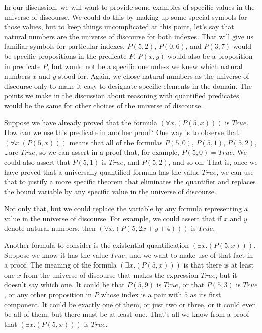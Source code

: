 {{In our discussion, we will want to provide some examples
of specific values in the universe of discourse.
We could do this by making up some special symbols for those values,
but to keep things uncomplicated at this point,
let's say that natural numbers are the universe of discourse for both indexes.
That will give us familiar symbols for particular indexes.
$P(5,2)$, $P(0,6)$, and $P(3,7)$ would be specific propositions in the predicate $P$.
$P(x,y)$ would also be a proposition in predicate $P$, but would not be a specific one
unless we knew which natural numbers $x$ and $y$ stood for.
Again, we chose natural numbers as the universe of discourse
only to make it easy to designate specific elements in the domain.
The points we make in the discussion about reasoning with quantified predicates
would be the same for other choices of the universe of discourse.

Suppose we have already proved that the formula $(\forall x.(P(5, x)))$ is $True$.
How can we use this predicate in another proof?
One way is to observe that $(\forall x.(P(5, x)))$ means that all of the formulas
$P(5, 0)$, $P(5, 1)$, $P(5, 2)$, \dots are $True$,
so we can assert in a proof that, for example,
$P(5, 0) = True$. We could also assert that $P(5, 1)$ is $True$, and $P(5, 2)$, and so on.
That is, once we have proved that a universally quantified formula has the value $True$,
we can use that to justify a more specific theorem that
eliminates the quantifier and replaces the bound variable by any specific value
in the universe of discourse.

Not only that, but we could replace the variable by any formula
representing a value in the universe of discourse.
For example, we could assert that if $x$ and $y$ denote natural numbers,
then $(\forall x.(P(5, 2x + y + 4)))$ is $True$.

Another formula to consider is the existential quantification $(\exists x.(P(5, x)))$.
Suppose we know it has the value $True$, and we want to make use of that fact in a proof.
The meaning of the formula $(\exists x.(P(5, x)))$ is that
there is at least one $x$ from the universe of discourse that makes the expression $True$,
but it doesn't say which one.
It could be that $P(5, 9)$ is $True$, or that $P(5, 3)$ is $True$,
or any other proposition in $P$ whose index is a pair with $5$ as its first component.
It could be exactly one of them,
or just two or three, or it could even be all of them, but
there must be at least one. That's all we know
from a proof that $(\exists x.(P(5, x)))$ is $True$.

}}
